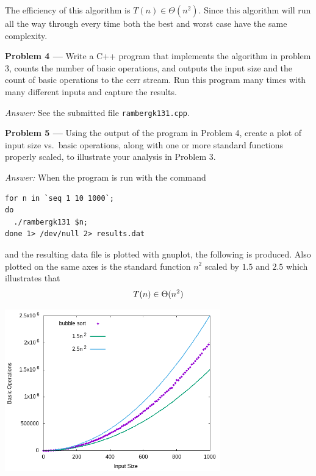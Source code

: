 \documentclass[11pt]{article}
\newcommand{\problem}[1]{\textbf{Problem #1 ---} }
\newcommand{\answer}{\textit{Answer: } }
\begin{document}
The efficiency of this algorithm is $T(n) \in \Theta(n^2)$.
Since this algorithm will run all the way through every time both the best and
worst case have the same complexity.


\problem{4} Write a C++ program that implements the algorithm
in problem 3, counts the number of basic operations, and outputs the
input size and the count of basic operations to the cerr stream. Run
this program many times with many different inputs and capture the
results.

\answer See the submitted file \texttt{rambergk131.cpp}.


\problem{5} Using the output of the program in Problem 4, create a
plot of input size vs.\ basic operations, along with one or more
standard functions properly scaled, to illustrate your analysis in
Problem 3.

\answer When the program is run with the command

\begin{Verbatim}
for n in `seq 1 10 1000`;
do 
  ./rambergk131 $n;
done 1> /dev/null 2> results.dat
\end{Verbatim}

and the resulting data file is plotted with gnuplot, the following is
produced. Also plotted on the same axes is the standard
function $n^2$ scaled by $1.5$ and $2.5$ which illustrates that
\[
T(n) \in \Theta(n^2)\\
\]

\begin{center}
  \includegraphics[width=0.7\textwidth]{problem5.png}
\end{center} 
\end{document}
